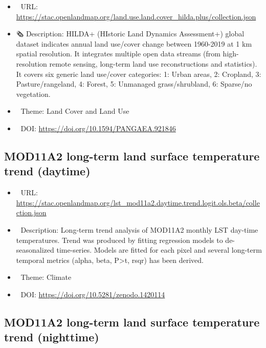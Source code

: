 \documentclass[
  graybox,natbib,nospthms]{svmono}
\providecommand{\tightlist}{%
  \setlength{\itemsep}{0pt}\setlength{\parskip}{0pt}}
\providecommand{\tightlist}{\setlength{\itemsep}{0pt}\setlength{\parskip}{0pt}}
\begin{document}
\begin{itemize}
\tightlist
\item
  🔗 URL: \url{https://stac.openlandmap.org/land.use.land.cover_hilda.plus/collection.json}
\item
  🗞 Description: HILDA+ (HIstoric Land Dynamics Assessment+) global dataset indicates annual land use/cover change between 1960-2019 at 1 km spatial resolution. It integrates multiple open data streams (from high-resolution remote sensing, long-term land use reconstructions and statistics). It covers six generic land use/cover categories: 1: Urban areas, 2: Cropland, 3: Pasture/rangeland, 4: Forest, 5: Unmanaged grass/shrubland, 6: Sparse/no vegetation.
\item
  📝 Theme: Land Cover and Land Use
\item
  📂 DOI: \url{https://doi.org/10.1594/PANGAEA.921846}
\end{itemize}

\hypertarget{mod11a2-long-term-land-surface-temperature-trend-daytime}{%
\subsection{MOD11A2 long-term land surface temperature trend (daytime)}\label{mod11a2-long-term-land-surface-temperature-trend-daytime}}

\begin{itemize}
\tightlist
\item
  🔗 URL: \url{https://stac.openlandmap.org/lst_mod11a2.daytime.trend.logit.ols.beta/collection.json}
\item
  📰 Description: Long-term trend analysis of MOD11A2 monthly LST day-time temperatures. Trend was produced by fitting regression models to de-seasonalized time-series. Models are fitted for each pixel and several long-term temporal metrics (alpha, beta, P\textgreater\textbar t\textbar, rsqr) has been derived.
\item
  📝 Theme: Climate
\item
  📂 DOI: \url{https://doi.org/10.5281/zenodo.1420114}
\end{itemize}

\hypertarget{mod11a2-long-term-land-surface-temperature-trend-nighttime}{%
\subsection{MOD11A2 long-term land surface temperature trend (nighttime)}\label{mod11a2-long-term-land-surface-temperature-trend-nighttime}}
\end{document}
